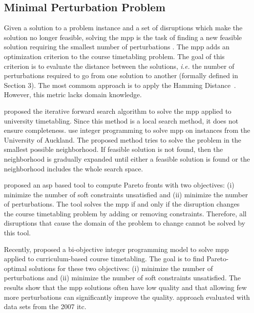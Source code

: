 \documentclass[twocolumn,natbib]{svjour3}          %
\newcounter{constraint}
\begin{document}
\subsection{Minimal Perturbation Problem}

Given a solution to a problem instance and a set of disruptions which make the solution no longer feasible, solving the \gls{mpp} is the task of finding a new feasible solution requiring the smallest number of perturbations \citep{DBLP:journals/constraints/SakkoutW00,DBLP:journals/constraints/ZivanGM11,APhillips2017}. 
The \gls{mpp} adds an optimization criterion to the course  timetabling problem. The goal of this criterion is to evaluate the distance between the solutions, \emph{i.e.} the number of perturbations required to go from one solution to another (formally defined in Section 3). The most commom approach \citep{DBLP:journals/constraints/ZivanGM11,APhillips2017,DBLP:conf/patat/MullerRB04,DBLP:journals/anor/BanbaraIKOSSTW19,LINDAHL2019} is to apply the Hamming Distance~\citep{6772729}. However, this metric lacks domain knowledge.



\cite{DBLP:conf/patat/MullerRB04} proposed the iterative forward search algorithm to solve the \gls{mpp} applied to university timetabling. Since this method is a local search method, it does not ensure completeness. \cite{APhillips2017} use integer programming to solve \gls{mpp} on instances from the University of Auckland. The proposed method tries to solve the problem in the smallest possible neighborhood. If feasible solution is not found, then the neighborhood is gradually expanded until either a feasible solution is found or the neighborhood includes the whole search space. 

\cite{DBLP:journals/anor/BanbaraIKOSSTW19} proposed an \gls{asp} based tool to compute Pareto fronts with two objectives: (i) minimize the number of soft constraints unsatisfied and (ii) minimize the number of perturbations. The tool solves the \gls{mpp} if and only if the disruption changes the course  timetabling problem by adding or removing constraints. Therefore, all disruptions that cause the domain of the problem to change cannot be solved by this tool. 

Recently, \cite{LINDAHL2019} proposed a bi-objective integer programming model to solve \gls{mpp} applied to curriculum-based course timetabling. The goal is to find Pareto-optimal solutions for these two objectives: (i) minimize the number of perturbations and (ii) minimize the number of soft constraints unsatisfied. The results show that the \gls{mpp} solutions often have low quality and that allowing few more perturbations can significantly improve the quality. \cite{LINDAHL2019} approach evaluated with data sets from the 2007 \gls{itc}. 
\end{document}
